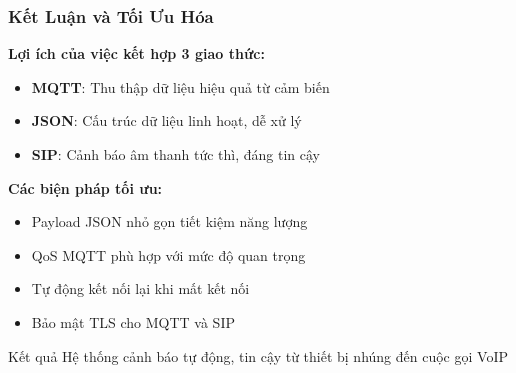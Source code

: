\begin{frame}
\frametitle{Kết Luận và Tối Ưu Hóa}

\textbf{Lợi ích của việc kết hợp 3 giao thức:}
\begin{itemize}
\item \textbf{MQTT}: Thu thập dữ liệu hiệu quả từ cảm biến
\item \textbf{JSON}: Cấu trúc dữ liệu linh hoạt, dễ xử lý
\item \textbf{SIP}: Cảnh báo âm thanh tức thì, đáng tin cậy
\end{itemize}

\textbf{Các biện pháp tối ưu:}
\begin{itemize}
\item Payload JSON nhỏ gọn tiết kiệm năng lượng
\item QoS MQTT phù hợp với mức độ quan trọng
\item Tự động kết nối lại khi mất kết nối
\item Bảo mật TLS cho MQTT và SIP
\end{itemize}

\begin{block}{Kết quả}
Hệ thống cảnh báo tự động, tin cậy từ thiết bị nhúng đến cuộc gọi VoIP
\end{block}
\end{frame}
